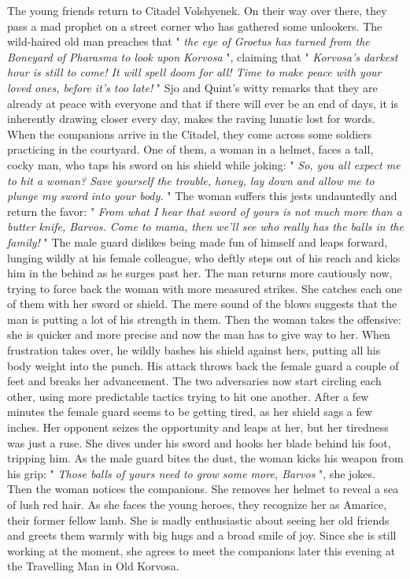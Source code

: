 The young friends return to Citadel Volshyenek. On their way over there, they pass a mad prophet on a street corner who has gathered some unlookers. The wild-haired old man preaches that " {\itshape the eye of Groetus has turned from the Boneyard of Pharasma to look upon Korvosa} ", claiming that "  {\itshape Korvosa's darkest hour is still to come! It will spell doom for all! Time to make peace with your loved ones, before it's too late!} " Sjo and Quint's witty remarks that they are already at peace with everyone and that if there will ever be an end of days, it is inherently drawing closer every day, makes the raving lunatic lost for words. When the companions arrive in the Citadel, they come across some soldiers practicing in the courtyard. One of them, a woman in a helmet, faces a tall, cocky man, who taps his sword on his shield while joking: " {\itshape So, you all expect me to hit a woman? Save yourself the trouble, honey, lay down and allow me to plunge my sword into your body.} " The woman suffers this jests undauntedly and return the favor: "  {\itshape From what I hear that sword of yours is not much more than a butter knife, Barvos. Come to mama, then we'll see who really has the balls in the family!} " The male guard dislikes being made fun of himself and leaps forward, lunging wildly at his female colleague, who deftly steps out of his reach and kicks him in the behind as he surges past her. The man returns more cautiously now, trying to force back the woman with more measured strikes. She catches each one of them with her sword or shield. The mere sound of the blows suggests that the man is putting a lot of his strength in them. Then the woman takes the offensive: she is quicker and more precise and now the man has to give way to her. When frustration takes over, he wildly bashes his shield against hers, putting all his body weight into the punch. His attack throws back the female guard a couple of feet and breaks her advancement. The two adversaries now start circling each other, using more predictable tactics trying to hit one another. After a few minutes the female guard seems to be getting tired, as her shield sags a few inches. Her opponent seizes the opportunity and leaps at her, but her tiredness was just a ruse. She dives under his sword and hooks her blade behind his foot, tripping him. As the male guard bites the dust, the woman kicks his weapon from his grip: " {\itshape Those balls of yours need to grow some more, Barvos} ", she jokes. Then the woman notices the companions. She removes her helmet to reveal a sea of lush red hair. As she faces the young heroes, they recognize her as Amarice, their former fellow lamb. She is madly enthusiastic about seeing her old friends and greets them warmly with big hugs and a broad smile of joy. Since she is still working at the moment, she agrees to meet the companions later this evening at the Travelling Man in Old Korvosa.\\

